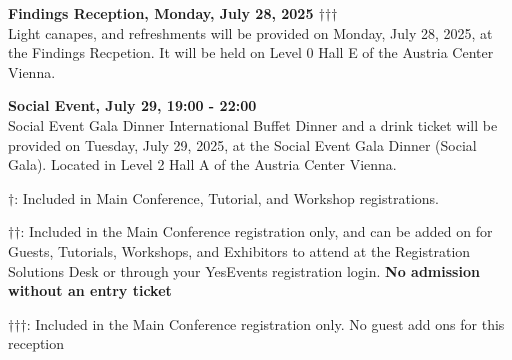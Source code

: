 \newpage
\textbf{Findings Reception, Monday, July 28, 2025 $\dagger$$\dagger$$\dagger$}\\
Light canapes, and refreshments will be provided on Monday, July 28, 2025, at the Findings Recpetion.  It will be held on Level 0 Hall E of the Austria Center Vienna.

\textbf{Social Event, July 29, 19:00 - 22:00}\\

Social Event Gala Dinner International Buffet Dinner and a drink ticket will be provided on Tuesday, July 29, 2025, at the Social Event Gala Dinner (Social Gala). Located in Level 2 Hall A of the Austria Center Vienna.

\vspace{4em}

$\dagger$: Included in Main Conference, Tutorial, and Workshop registrations.

$\dagger$$\dagger$: Included in the Main Conference registration only, and can be added on for Guests, Tutorials, Workshops, and Exhibitors to attend at the Registration Solutions Desk or through your YesEvents registration login. \textbf{No admission without an entry ticket}

$\dagger$$\dagger$$\dagger$: Included in the Main Conference registration only. No guest add ons for this reception
